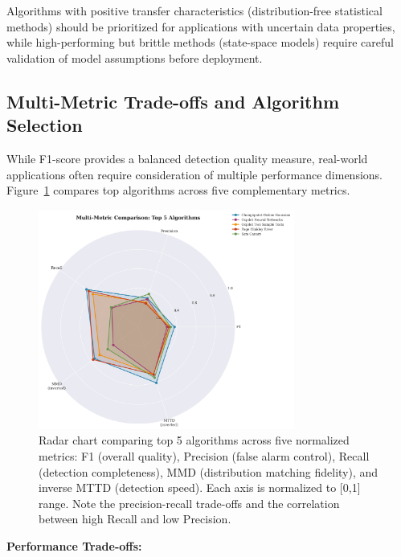 Algorithms with positive transfer characteristics (distribution-free statistical methods) should be prioritized for applications with uncertain data properties, while high-performing but brittle methods (state-space models) require careful validation of model assumptions before deployment.


\subsection{Multi-Metric Trade-offs and Algorithm Selection}

While F1-score provides a balanced detection quality measure, real-world applications often require consideration of multiple performance dimensions. Figure~\ref{fig:radar_metrics} compares top algorithms across five complementary metrics.

\begin{figure}[H]
\centering
\includegraphics[width=0.75\textwidth]{figures/fig_radar_metrics.png}
\caption{Radar chart comparing top 5 algorithms across five normalized metrics: F1 (overall quality), Precision (false alarm control), Recall (detection completeness), MMD (distribution matching fidelity), and inverse MTTD (detection speed). Each axis is normalized to [0,1] range. Note the precision-recall trade-offs and the correlation between high Recall and low Precision.}
\label{fig:radar_metrics}
\end{figure}

\textbf{Performance Trade-offs:}

